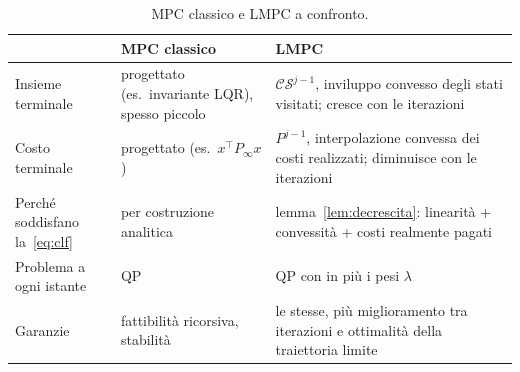 \documentclass[11pt,a4paper]{article}
\theoremstyle{definition}
\theoremstyle{plain}
\theoremstyle{remark}
\newcommand{\CS}{\mathcal{CS}}
\begin{document}
\begin{table}[h]
\centering
\caption{MPC classico e LMPC a confronto.}\label{tab:confronto}
\begin{tabular}{p{3.4cm}p{5.2cm}p{5.6cm}}
\toprule
 & MPC classico & LMPC \\
\midrule
Insieme terminale & progettato (es.\ invariante LQR), spesso piccolo & $\CS^{j-1}$, inviluppo convesso degli stati visitati; cresce con le iterazioni \\
Costo terminale & progettato (es.\ $x^\top P_\infty x$) & $P^{j-1}$, interpolazione convessa dei costi realizzati; diminuisce con le iterazioni \\
Perché soddisfano la~\eqref{eq:clf} & per costruzione analitica & lemma~\ref{lem:decrescita}: linearità + convessità + costi realmente pagati \\
Problema a ogni istante & QP & QP con in più i pesi $\lambda$ \\
Garanzie & fattibilità ricorsiva, stabilità & le stesse, più miglioramento tra iterazioni e ottimalità della traiettoria limite \\
\bottomrule
\end{tabular}
\end{table}
\end{document}
